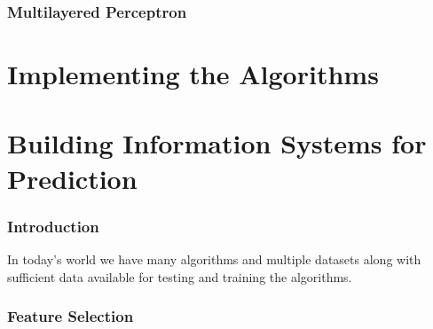 \documentclass[12pt]{article}
\begin{document}
\newpage
\section{Multilayered Perceptron}

\newpage
\part{Implementing the Algorithms}

\newpage
\part{Building Information Systems for Prediction}
\section{Introduction}
In today's world we have many algorithms and multiple datasets along with sufficient data available for testing and training the algorithms.



\section{Feature Selection}
\newpage
\end{document}
